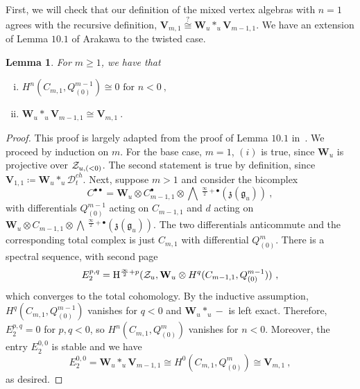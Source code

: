 \documentclass[a4paper]{article}
\newtheorem{lem}[thm]{Lemma}
\def\ZZ{{\cal Z}}
\def\gf{\mathfrak{g}}
\def \zf{\mathfrak{z}}
\newcommand{\Hi}[1]{\mathrm{H}^{\frac{\infty}{2}+#1}}
\newcommand{\Li}[1]{\mathrm{\bigwedge}\,^{\frac{\infty}{2}+#1}}
\def\D{\mathcal{D}^{ch}}
\def\W{\mathbf{W}}
\def\V{\mathbf{V}}
\begin{document}
First, we will check that our definition of the mixed vertex algebras with $n=1$ agrees with the recursive definition, $\V_{m,1}\overset{?}{\cong} \W_u\ast_u \V_{m-1,1}$. We have an extension of Lemma $10.1$ of Arakawa to the twisted case.
\begin{lem}\label{lem:mix_ff_cap}
For $m\geqslant 1$, we have that
\begin{enumerate}[(i)]
	\item $H^{n}(C_{m,1},Q^{m-1}_{(0)}) \cong 0\text{ for } n<0~,$
	\item $\W_u\ast_u \V_{m-1,1} \cong \V_{m,1}~.$
\end{enumerate}
\end{lem}
\begin{proof}
This proof is largely adapted from the proof of Lemma $10.1$ in~\cite{Arakawa:2018egx}.
We proceed by induction on $m$. For the base case, $m=1$, $(i)$ is true, since $\W_u$ is projective over $\ZZ_{u,(<0)}$. The second statement is true by definition, since $\V_{1,1}\coloneqq \W_u\ast_u\D_t$. Next, suppose $m>1$ and consider the bicomplex
\begin{equation*}
	C^{\bullet\bullet} = \W_u\otimes C_{m-1,1}^\bullet \otimes \Li{\bullet}(\zf(\gf_u))~,
\end{equation*}
with differentials $Q^{m-1}_{(0)}$ acting on $C_{m-1,1}$ and $d$ acting on $\W_u\otimes C_{m-1,1}\otimes \Li{\bullet}(\zf(\gf_u))$. The two differentials anticommute and the corresponding total complex is just $C_{m,1}$ with differential $Q^{m}_{(0)}$. There is a spectral sequence, with second page
\begin{equation*}
	E_{2}^{p,q} = \Hi{p}(\ZZ_u, \W_u\otimes H^{q}(C_{m-1,1},Q^{m-1}_{(0)}))~,
\end{equation*}
which converges to the total cohomology. By the inductive assumption, $H^{q}(C_{m,1},Q^{m-1}_{(0)})$ vanishes for $q<0$ and $\W_u\ast_u-$ is left exact. Therefore, $E_{2}^{p,q}=0$ for $p,q<0$, so $H^{n}(C_{m,1},Q^m_{(0)})$ vanishes for $n<0$. Moreover, the entry $E_{2}^{0,0}$ is stable and we have
\begin{equation}
	E_2^{0,0} = \W_u\ast_u \V_{m-1,1} \cong H^{0}(C_{m,1},Q^{m}_{(0)})\cong \V_{m,1}~,
\end{equation}
as desired.
\end{proof}
\vspace{-6pt}
\end{document}
